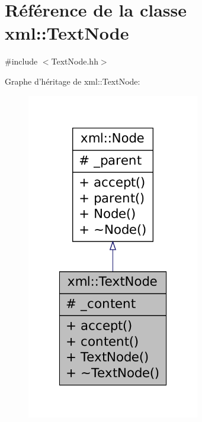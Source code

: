 \hypertarget{classxml_1_1_text_node}{
\section{Référence de la classe xml::TextNode}
\label{classxml_1_1_text_node}
}


{\ttfamily \#include $<$TextNode.hh$>$}



Graphe d'héritage de xml::TextNode:
\nopagebreak
\begin{figure}[H]
\begin{center}
\leavevmode
\includegraphics[width=214pt]{classxml_1_1_text_node__inherit__graph}
\end{center}
\end{figure}


